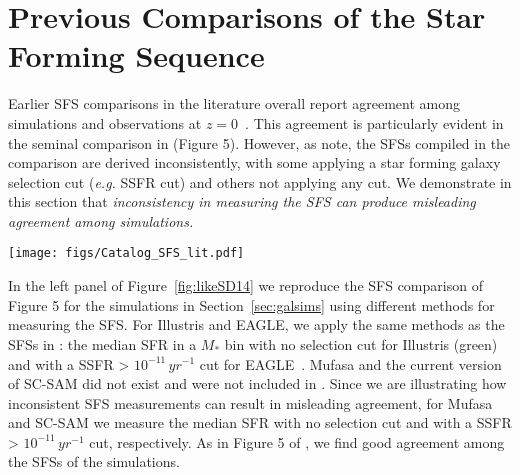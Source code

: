 \documentclass[tighten, preprint]{aastex62}
\begin{document}
\section{Previous Comparisons of the Star Forming Sequence} \label{app:literature}
Earlier SFS comparisons in the literature overall report agreement among 
simulations and observations at $z=0$~\citep[\emph{e.g.}][]{genel2014, somerville2015, sparre2015, schaye2015, bluck2016, dave2016}. 
This agreement is particularly evident in the seminal comparison in 
\cite{somerville2015b} (Figure 5). However, as \cite{somerville2015b} note, 
the SFSs compiled in the comparison are derived inconsistently, with some 
applying a star forming galaxy selection cut (\emph{e.g.} SSFR cut) and 
others not applying any cut. We demonstrate in this section that {\em inconsistency 
in measuring the SFS can produce misleading agreement among simulations.} 

\begin{figure*}
\begin{center}
\texttt{[image: figs/Catalog\_SFS\_lit.pdf]} 
\caption{The SFSs of Illustris, EAGLE, {\sc Mufasa}, and SC-SAM central 
galaxies, where we measure the SFSs using different methods as in Figure 5 
of \cite{somerville2015b} (left panel) and using the same method (right panel). 
In the left panel, we measure the SFSs by taking the median SFR in 
a $M_*$ bin with no selection cuts for Illustris and {\sc Mufasa}
and by taking the median SFR after a SSFR > $10^{-11}\,yr^{-1}$ cut 
for EAGLE and SC-SAM. In the right panel, we measure the SFSs by taking 
the median SFR after a SSFR > $10^{-11}\,yr^{-1}$ cut for all four simulations.
The difference between the two panels illustrate that \emph{the agreement 
found in the left panel, and similarly in \cite{somerville2015b},
is mainly driven by the difference in methods used to measure SFSs.}
} 
\label{fig:likeSD14}
\end{center}
\end{figure*}

In the left panel of Figure~\ref{fig:likeSD14} we reproduce the SFS comparison of 
\cite{somerville2015b} Figure 5 for the simulations in Section~\ref{sec:galsims}
using different methods for measuring the SFS. For Illustris and EAGLE, we apply
the same methods as the SFSs in \cite{somerville2015b}: 
the median SFR in a $M_*$ bin with no selection cut for Illustris (green) and 
with a SSFR > $10^{-11}\,yr^{-1}$ cut for EAGLE~\citep[red;][]{schaye2015}. 
{\sc Mufasa} and the current version of SC-SAM did not exist and were not 
included in \cite{somerville2015b}. Since we are illustrating how inconsistent 
SFS measurements can result in misleading agreement, for {\sc Mufasa} and 
SC-SAM we measure the median SFR with no selection cut and with a SSFR > 
$10^{-11}\,yr^{-1}$ cut, respectively. As in Figure 5 of \cite{somerville2015b}, 
we find good agreement among the SFSs of the simulations. 
\end{document}

